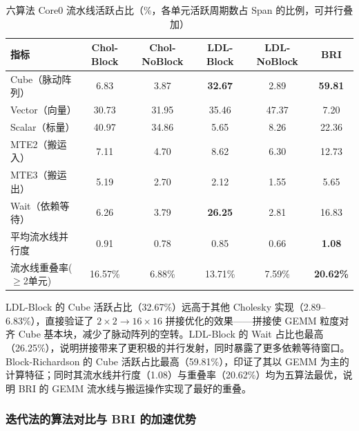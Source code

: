 \documentclass{CjC}
\begin{document}
    \begin{table}[H]
        \centering
        \caption{六算法 Core0 流水线活跃占比（\%，各单元活跃周期数占 Span
        的比例，可并行叠加）}
        \begin{tabular}{l c c c c c}
            \toprule \textbf{指标} & Chol-Block & Chol-NoBlock & LDL-Block      & LDL-NoBlock & BRI              \\
            \midrule Cube（脉动阵列）  & 6.83       & 3.87         & \textbf{32.67} & 2.89        & \textbf{59.81}   \\
            Vector（向量）           & 30.73      & 31.95        & 35.46          & 47.37       & 7.20             \\
            Scalar（标量）           & 40.97      & 34.86        & 5.65           & 8.26        & 22.36            \\
            MTE2（搬运入）            & 7.11       & 4.70         & 8.62           & 6.30        & 12.73            \\
            MTE3（搬运出）            & 5.19       & 2.70         & 2.12           & 1.55        & 5.65             \\
            Wait（依赖等待）           & 6.26       & 3.79         & \textbf{26.25} & 2.81        & 16.83            \\
            \midrule 平均流水线并行度    & 0.91       & 0.78         & 0.85           & 0.66        & \textbf{1.08}    \\
            流水线重叠率($\ge$2单元)     & 16.57\%    & 6.88\%       & 13.71\%        & 7.59\%      & \textbf{20.62\%} \\
            \bottomrule
        \end{tabular}
    \end{table}

    LDL-Block 的 Cube 活跃占比（32.67\%）远高于其他 Cholesky 实现（2.89--6.83\%），直接验证了
    $2\times2\rightarrow16\times16$ 拼接优化的效果——拼接使 GEMM 粒度对齐 Cube
    基本块，减少了脉动阵列的空转。LDL-Block 的 Wait 占比也最高（26.25\%），说明拼接带来了更积极的并行发射，同时暴露了更多依赖等待窗口。Block-Richardson
    的 Cube 活跃占比最高（59.81\%），印证了其以 GEMM
    为主的计算特征；同时其流水线并行度（1.08）与重叠率（20.62\%）均为五算法最优，说明
    BRI 的 GEMM 流水线与搬运操作实现了最好的重叠。

    \subsubsection{迭代法的算法对比与 BRI 的加速优势}
    \label{sec:ns-vs-bri}
\end{document}
